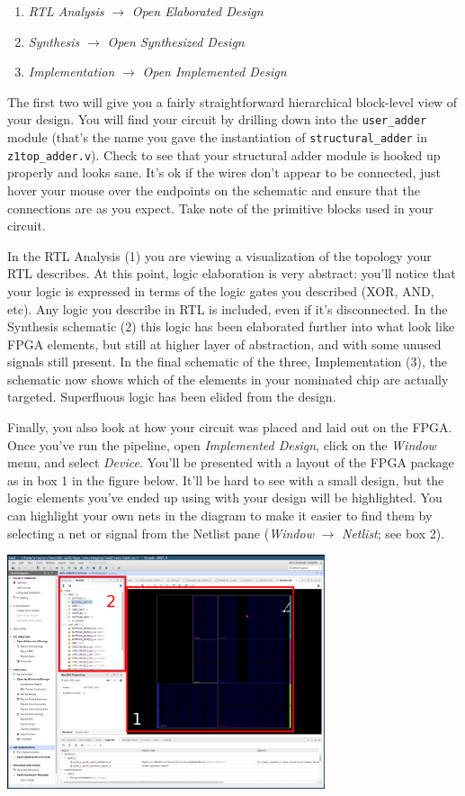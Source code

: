 \documentclass[11pt]{article}
\begin{document}
\begin{enumerate}
  \item \emph{RTL Analysis} $\rightarrow$ \emph{Open Elaborated Design}
  \item \emph{Synthesis} $\rightarrow$ \emph{Open Synthesized Design}
  \item \emph{Implementation} $\rightarrow$ \emph{Open Implemented Design}
\end{enumerate}

The first two will give you a fairly straightforward hierarchical block-level view of your design. You will find your circuit by drilling down into the \verb|user_adder| module (that's the name you gave the instantiation of \verb|structural_adder| in \verb|z1top_adder.v|).
Check to see that your structural adder module is hooked up properly and looks sane.
It's ok if the wires don't appear to be connected, just hover your mouse over the endpoints on the schematic and ensure that the connections are as you expect.
Take note of the primitive blocks used in your circuit.

In the RTL Analysis (1) you are viewing a visualization of the topology your RTL describes. At this point, logic elaboration is very abstract: you'll notice that your logic is expressed in terms of the logic gates you described (XOR, AND, etc). Any logic you describe in RTL is included, even if it's disconnected. In the Synthesis schematic (2) this logic has been elaborated further into what look like FPGA elements, but still at higher layer of abstraction, and with some unused signals still present. In the final schematic of the three, Implementation (3), the schematic now shows which of the elements in your nominated chip are actually targeted. Superfluous logic has been elided from the design.

Finally, you also look at how your circuit was placed and laid out on the FPGA. Once you've run the pipeline, open \emph{Implemented Design}, click on the \emph{Window} menu, and select \emph{Device}. You'll be presented with a layout of the FPGA package as in box 1 in the figure below. It'll be hard to see with a small design, but the logic elements you've ended up using with your design will be highlighted. You can highlight your own nets in the diagram to make it easier to find them by selecting a net or signal from the Netlist pane (\emph{Window} $\rightarrow$ \emph{Netlist}; see box 2).

\begin{center}
  \includegraphics[width=0.7\textwidth]{figs/fpga_layout.png}
\end{center}
\end{document}
